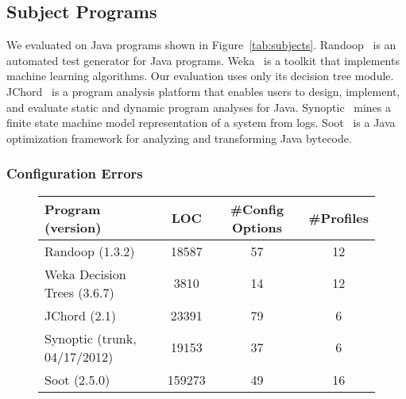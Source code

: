 \vspace{-1mm}
\vspace{-1mm}

\subsection{Subject Programs}

\vspace{-1mm}

We evaluated \ourtool on \subjectnum Java programs shown
in Figure~\ref{tab:subjects}.
Randoop~\cite{PachecoLET2007} is an automated test generator
for Java programs. Weka~\cite{weka} is a toolkit that implements
machine learning algorithms. Our evaluation
uses only its decision tree module. JChord~\cite{jchord}
is a program analysis platform that enables users to design, implement,
and evaluate static and dynamic program analyses for Java.
Synoptic~\cite{synoptic} mines a finite state machine
model representation of a system from logs.
Soot~\cite{soot} is a Java optimization framework for analyzing and transforming Java bytecode.



\smallsqueeze
\subsubsection{Configuration Errors}

\vspace{-1mm}

\begin{figure}[t]
\vspace{1mm}
\centering
\small{
\setlength{\tabcolsep}{.50\tabcolsep}
\begin{tabular}{|l|c|c|c|}
\hline
 Program (version) & LOC & \#Config Options & \#Profiles\\
 \hline
 \hline
 Randoop (1.3.2) & 18587 & 57 & 12\\
 Weka Decision Trees (3.6.7) & 3810 & 14 & 12\\
 JChord (2.1) & 23391 &  79 & 6 \\
 Synoptic (trunk, 04/17/2012) & 19153 & 37 & 6\\
 Soot (2.5.0) & 159273 & 49 & 16 \\
\hline
\end{tabular}
}
\vspace{-2mm}
\end{figure}


